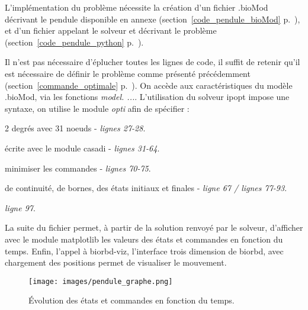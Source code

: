 L'implémentation du problème nécessite la création d'un fichier .bioMod décrivant le pendule disponible en annexe 
(section~\ref{code_pendule_bioMod} p.~\pageref{code_pendule_bioMod}), et d'un fichier appelant le solveur et décrivant le problème (section~\ref{code_pendule_python} p.~\pageref{code_pendule_python}).

Il n'est pas nécessaire d’éplucher toutes les lignes de code, il suffit de retenir qu'il est nécessaire de définir le problème comme présenté précédemment (section~\ref{commande_optimale} p.~\pageref{commande_optimale}).  On accède aux caractéristiques du modèle .bioMod, via les fonctions \emph{model. ...}.
L'utilisation du solveur ipopt impose une syntaxe, on utilise le module \emph{opti} afin de spécifier :
\begin{description}
\setlength\itemsep{-0.2em}
\item [les degrés de liberté et le nombre de noeuds :] 2 degrés avec 31 noeuds - \emph{lignes 27-28}.
\item [le système dynamique :] écrite avec le module casadi - \emph{lignes 31-64}.
\item [les fonction objectif :] minimiser les commandes - \emph{lignes 70-75}.
\item [les contraintes :] de continuité, de bornes, des états initiaux et finales - \emph{ligne 67 / lignes 77-93}.
\item [l'appel au solveur :] \emph{ligne 97}.
\end{description}

La suite du fichier permet, à partir de la solution renvoyé par le solveur, d'afficher avec le module matplotlib les valeurs des états et commandes en fonction du temps. Enfin, l'appel à biorbd-viz, l'interface trois dimension de biorbd, avec chargement des positions permet de visualiser le mouvement. 

\begin{figure}[H]
\begin{center}
\texttt{[image: images/pendule\_graphe.png]}
\caption{\'Evolution des états et commandes en fonction du temps.}
\end{center}
\end{figure}
\newcommand\w{8cm}

\newpage

